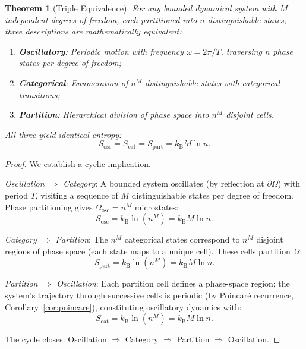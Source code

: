 \documentclass[twocolumn,10pt]{article}
\newtheorem{theorem}{Theorem}[section]
\theoremstyle{definition}
\newcommand{\kB}{k_{\mathrm{B}}}
\begin{document}
\begin{theorem}[Triple Equivalence]\label{thm:triple}
For any bounded dynamical system with $M$ independent degrees of freedom, each partitioned into $n$ distinguishable states, three descriptions are mathematically equivalent:
\begin{enumerate}[nosep]
    \item \textbf{Oscillatory}: Periodic motion with frequency $\omega = 2\pi/T$, traversing $n$ phase states per degree of freedom;
    \item \textbf{Categorical}: Enumeration of $n^M$ distinguishable states with categorical transitions;
    \item \textbf{Partition}: Hierarchical division of phase space into $n^M$ disjoint cells.
\end{enumerate}
All three yield identical entropy:
\begin{equation}\label{eq:triple_entropy}
    \boxed{S_{\mathrm{osc}} = S_{\mathrm{cat}} = S_{\mathrm{part}} = \kB M \ln n.}
\end{equation}
\end{theorem}

\begin{proof}
We establish a cyclic implication.

\emph{Oscillation $\Rightarrow$ Category}: A bounded system oscillates (by reflection at $\partial\Omega$) with period $T$, visiting a sequence of $M$ distinguishable states per degree of freedom. Phase partitioning gives $\Omega_{\mathrm{osc}} = n^M$ microstates:
\begin{equation}
    S_{\mathrm{osc}} = \kB \ln(n^M) = \kB M \ln n.
\end{equation}

\emph{Category $\Rightarrow$ Partition}: The $n^M$ categorical states correspond to $n^M$ disjoint regions of phase space (each state maps to a unique cell). These cells partition $\Omega$:
\begin{equation}
    S_{\mathrm{part}} = \kB \ln(n^M) = \kB M \ln n.
\end{equation}

\emph{Partition $\Rightarrow$ Oscillation}: Each partition cell defines a phase-space region; the system's trajectory through successive cells is periodic (by Poincar\'e recurrence, Corollary~\ref{cor:poincare}), constituting oscillatory dynamics with:
\begin{equation}
    S_{\mathrm{cat}} = \kB \ln(n^M) = \kB M \ln n.
\end{equation}

The cycle closes: Oscillation $\Rightarrow$ Category $\Rightarrow$ Partition $\Rightarrow$ Oscillation.
\end{proof}
\end{document}
